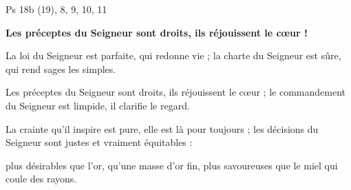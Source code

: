  Ps 18b (19), 8, 9, 10, 11

\textbf{Les préceptes du Seigneur sont droits,
ils réjouissent le cœur !}

\smallskip
La loi du Seigneur est parfaite,
qui redonne vie ;
la charte du Seigneur est sûre,
qui rend sages les simples.

\smallskip
Les préceptes du Seigneur sont droits,
ils réjouissent le cœur ;
le commandement du Seigneur est limpide,
il clarifie le regard.

\smallskip
La crainte qu’il inspire est pure,
elle est là pour toujours ;
les décisions du Seigneur sont justes
et vraiment équitables :

\smallskip
plus désirables que l’or,
qu’une masse d’or fin,
plus savoureuses que le miel
qui coule des rayons.

